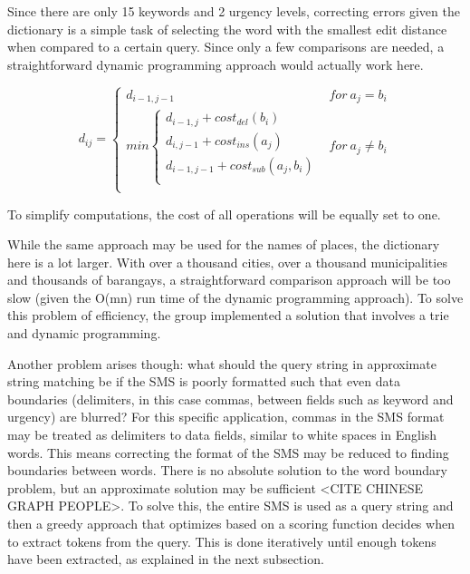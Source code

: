 \documentclass{acm_proc_article-sp}
\begin{document}
Since there are only 15 keywords and 2 urgency levels, correcting errors given the dictionary is a simple task of selecting
the word with the smallest edit distance when compared to a certain query. Since only a few comparisons are needed, a straightforward
dynamic programming approach would actually work here. 

\begin{displaymath}
	d_{ij} = \left\{
		\begin{array}{lr}
			d_{i-1,j-1} & for \ a_j = b_i\\
			min \left\{
				\begin{array}{lr}
						d_{i-1,j} + cost_{del} (b_i)\\
						d_{i,j-1} + cost_{ins} (a_j)\\
						d_{i-1,j-1} + cost_{sub} (a_j, b_i)\\
				\end{array}	\right. & for \ a_j \not = b_i\\
		\end{array}
		\right.
\end{displaymath}

To simplify computations, the cost of all operations will be equally set to one. 

While the same approach may be used for the names of places, the dictionary here is a lot larger. With over a thousand cities, over a thousand municipalities and thousands of barangays, a straightforward comparison approach will be too slow (given the O(mn) run time of the dynamic programming approach). To solve this problem of efficiency, the group implemented a solution that involves a trie and dynamic programming.

Another problem arises though: what should the query string in approximate string matching be if the SMS is poorly formatted such that even data boundaries (delimiters, in this case commas, between fields such as keyword and urgency) are blurred? For this specific application, commas in the SMS format may be treated as delimiters to data fields, similar to white spaces in English words. This means correcting the format of the SMS may be reduced to finding boundaries between words. There is no absolute solution to the word boundary problem, but an approximate solution may be sufficient <CITE CHINESE GRAPH PEOPLE>.  To solve this, the entire SMS is used as a query string and then a greedy approach that optimizes based on a scoring function decides when to extract tokens from the query. This is done iteratively until enough tokens have been extracted, as explained in the next subsection. 
\end{document}
